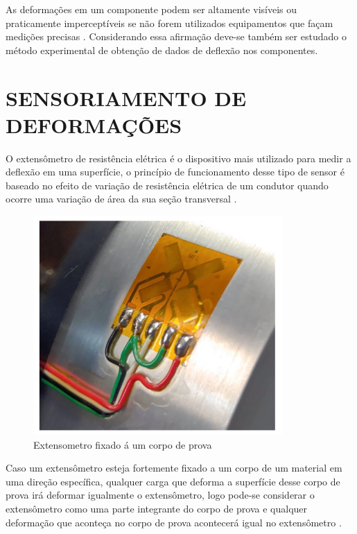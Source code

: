 As deformações em um componente podem ser altamente visíveis ou praticamente imperceptíveis se não forem utilizados equipamentos que façam medições precisas \autocite{Hibbeler2010}. Considerando essa afirmação deve-se também ser estudado o método experimental de obtenção de dados de deflexão nos componentes.

\section{SENSORIAMENTO DE DEFORMAÇÕES}

O extensômetro de resistência elétrica é o dispositivo mais utilizado para medir a deflexão em uma superfície, o princípio de funcionamento desse tipo de sensor é baseado no efeito de variação de resistência elétrica de um condutor quando ocorre uma variação de área da sua seção transversal \autocite{Hollman2011}.

\begin{figure}[htb]
	\caption{\label{fig:1080} Extensometro fixado á um corpo de prova}
	\begin{center}
		\includegraphics[width=\textwidth]{pictures/1080.png}
	\end{center}
\end{figure}

Caso um extensômetro esteja fortemente fixado a um corpo de um material em uma direção específica, qualquer carga que deforma a superfície desse corpo de prova irá deformar igualmente o extensômetro, logo pode-se considerar o extensômetro como uma parte integrante do corpo de prova e qualquer deformação que aconteça no corpo de prova acontecerá igual no extensômetro \autocite{Hibbeler2010}.

